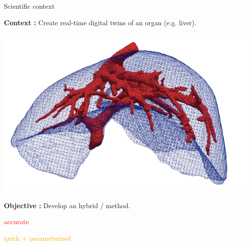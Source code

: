 \begin{frame}{Scientific context}
	\begin{minipage}{0.78\linewidth}
		\textbf{Context :} Create real-time digital twins of an organ (e.g. liver).
	\end{minipage}
	\begin{minipage}{0.18\linewidth}
		\vspace{-20pt}
		\includegraphics[width=0.95\linewidth]{images/intro/liver.png}
	\end{minipage}
	
	\vspace{3pt}
	\textbf{Objective :} Develop an hybrid  /  method.
	
	\vspace{1pt}
	\small
	\hspace{130pt} \begin{minipage}{0.14\linewidth}
		\textcolor{red}{accurate}
	\end{minipage} \hspace{8pt} \begin{minipage}{0.3\linewidth}
		\textcolor{orange}{quick + parameterized}
	\end{minipage}


\end{frame}
